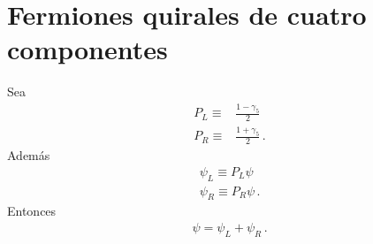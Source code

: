 \section{Fermiones quirales de cuatro componentes}
\label{sec:ferm-quir-de}

Sea
\begin{align}
  P_L\equiv&\frac{1-\gamma_5}{2}\nonumber\\
  P_R\equiv&\frac{1+\gamma_5}{2}\,.
\end{align}
Además
\begin{align}
  \psi_L\equiv P_L\psi\nonumber\\
  \psi_R\equiv P_R\psi\,.
\end{align}
Entonces
\begin{align}
  \psi=\psi_L+\psi_R\,.
\end{align}


